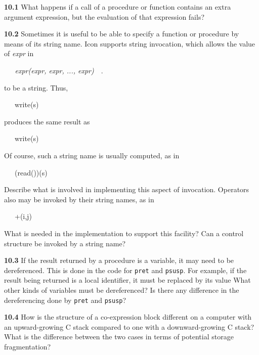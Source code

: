 \textbf{10.1} What happens if a call of a procedure or function
contains an extra argument expression, but the evaluation of that
expression fails?

\textbf{10.2} Sometimes it is useful to be able to specify a function
or procedure by means of its string name. Icon supports
{\textquotedbl}string invocation,{\textquotedbl} which allows the
value of \textit{expr} in

{\ttfamily\mdseries
\textit{\ \ \ expr(expr,
expr, ..., expr)}\ \ .}

\noindent to be a string. Thus,

{\ttfamily\mdseries
\ \ \ {\textquotedbl}write{\textquotedbl}(s)}

\noindent produces the same result as

{\ttfamily\mdseries
\ \ \ write(s)}

Of course, such a string name is usually computed, as in

{\ttfamily\mdseries
\ \ \ (read())(s)}

Describe what is involved in implementing this aspect of
invocation. Operators also may be invoked by their string names, as in

{\ttfamily\mdseries
\ \ \ {\textquotedbl}+{\textquotedbl}(i,j)}

What is needed in the implementation to support this facility? Can a
control structure be invoked by a string name?

\textbf{10.3} If the result returned by a procedure is a variable, it
may need to be dereferenced. This is done in the code for
\texttt{pret} and \texttt{psusp}. For example, if the result being
returned is a local identifier, it must be replaced by its value What
other kinds of variables must be dereferenced? Is there any difference
in the dereferencing done by \texttt{pret} and \texttt{psusp}?

\textbf{10.4} How is the structure of a co-expression block different
on a computer with an upward-growing C stack compared to one with a
downward-growing C stack? What is the difference between the two cases
in terms of potential storage fragmentation?
